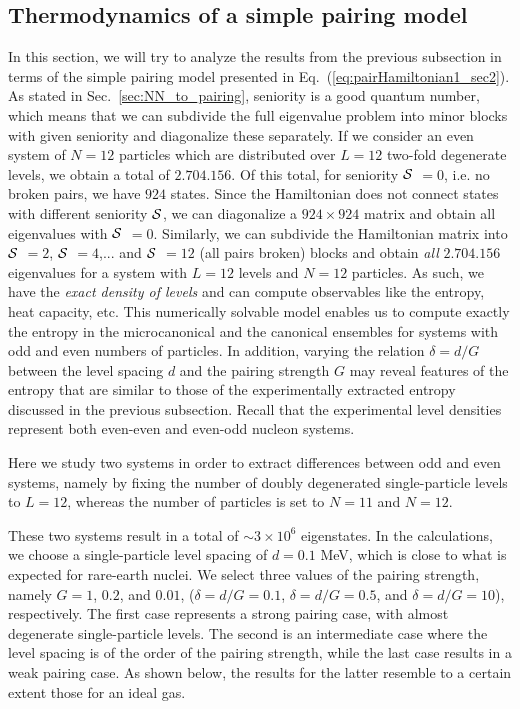 \documentclass[rmp,preprint,aps,floatfix]{revtex4}
\begin{document}
\subsection{Thermodynamics of a simple pairing model}
\label{subsec:statprops}


In this section, we will try to analyze the results from the previous
subsection in terms of the simple pairing model presented in 
Eq.~(\ref{eq:pairHamiltonian1_sec2}). 
As stated in Sec.~\ref{sec:NN_to_pairing}, seniority is
a good quantum number, which 
means that we can subdivide the full eigenvalue problem 
into minor blocks with given seniority and diagonalize these 
separately. 
If we consider an even  system of $N=12$ 
particles which are distributed over $L=12$ two-fold 
degenerate levels, we obtain a total of $2.704.156$.
Of this total, for seniority
$\cal{S}$ $=0$, i.e. no broken pairs, we have $924$
states. Since the Hamiltonian does not connect states with 
different seniority $\cal{S}$, we can diagonalize a 
$924\times 924$ matrix and obtain all eigenvalues with 
$\cal{S}$ $=0$. Similarly, we can subdivide the Hamiltonian 
matrix into $\cal{S}$ $=2$, $\cal{S}$ $=4$,... and 
$\cal{S}$ $=12$ (all pairs broken) blocks and obtain 
{\em all} $2.704.156$ eigenvalues for a system with $L=12$ 
levels and $N=12$ particles. As such, we have the 
{\em exact density of levels} and can compute observables like the 
entropy, heat capacity, etc. This numerically solvable model 
enables us to compute exactly the entropy in the microcanonical 
and the canonical ensembles for systems with odd and even numbers 
of particles.  In addition, varying the relation $\delta=d/G$  between the 
level spacing $d$ and the pairing 
strength $G$ may reveal features of the entropy that are 
similar to those of the experimentally extracted entropy discussed
in the previous subsection. Recall that the experimental level densities  
represent both even-even and even-odd nucleon systems.

Here we study two systems in order to extract differences 
between odd and even systems, namely by fixing the number of 
doubly degenerated single-particle levels to $L=12$, whereas the 
number of particles is set to $N=11$ and $N=12$.  

These two systems result in a total of 
$\sim 3 \times 10^6$ eigenstates. In the calculations, we 
choose a single-particle level spacing of $d=0.1$ MeV, which is close 
to what is expected for rare-earth nuclei. 
We select three values of the pairing strength, 
namely $G=1$, $0.2$, and $0.01$, 
($\delta=d/G=0.1$, $\delta=d/G=0.5$, and $\delta=d/G=10$), 
respectively. The first case represents a strong 
pairing case, with almost degenerate single-particle levels. The 
second is an intermediate case where the level spacing is of 
the order of the pairing strength, while the last case results in 
a weak pairing case. As shown below, the results for the latter 
resemble to a certain extent those for an ideal gas.
\end{document}
